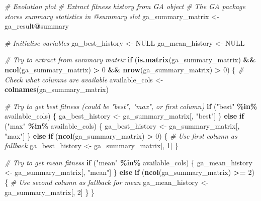 \documentclass[
]{article}
\newenvironment{Shaded}{\begin{snugshade}}{\end{snugshade}}
\newcommand{\CommentTok}[1]{\textcolor[rgb]{0.56,0.35,0.01}{\textit{#1}}}
\newcommand{\ConstantTok}[1]{\textcolor[rgb]{0.56,0.35,0.01}{#1}}
\newcommand{\ControlFlowTok}[1]{\textcolor[rgb]{0.13,0.29,0.53}{\textbf{#1}}}
\newcommand{\DecValTok}[1]{\textcolor[rgb]{0.00,0.00,0.81}{#1}}
\newcommand{\FunctionTok}[1]{\textcolor[rgb]{0.13,0.29,0.53}{\textbf{#1}}}
\newcommand{\NormalTok}[1]{#1}
\newcommand{\OtherTok}[1]{\textcolor[rgb]{0.56,0.35,0.01}{#1}}
\newcommand{\SpecialCharTok}[1]{\textcolor[rgb]{0.81,0.36,0.00}{\textbf{#1}}}
\newcommand{\StringTok}[1]{\textcolor[rgb]{0.31,0.60,0.02}{#1}}
\begin{document}
\begin{Shaded}
\begin{Highlighting}[]
\CommentTok{\# Evolution plot}
\CommentTok{\# Extract fitness history from GA object}
\CommentTok{\# The GA package stores summary statistics in @summary slot}
\NormalTok{ga\_summary\_matrix }\OtherTok{\textless{}{-}}\NormalTok{ ga\_result}\SpecialCharTok{@}\NormalTok{summary}

\CommentTok{\# Initialise variables}
\NormalTok{ga\_best\_history }\OtherTok{\textless{}{-}} \ConstantTok{NULL}
\NormalTok{ga\_mean\_history }\OtherTok{\textless{}{-}} \ConstantTok{NULL}

\CommentTok{\# Try to extract from summary matrix}
\ControlFlowTok{if}\NormalTok{ (}\FunctionTok{is.matrix}\NormalTok{(ga\_summary\_matrix) }\SpecialCharTok{\&\&} \FunctionTok{ncol}\NormalTok{(ga\_summary\_matrix) }\SpecialCharTok{\textgreater{}} \DecValTok{0} \SpecialCharTok{\&\&} \FunctionTok{nrow}\NormalTok{(ga\_summary\_matrix) }\SpecialCharTok{\textgreater{}} \DecValTok{0}\NormalTok{) \{}
  \CommentTok{\# Check what columns are available}
\NormalTok{  available\_cols }\OtherTok{\textless{}{-}} \FunctionTok{colnames}\NormalTok{(ga\_summary\_matrix)}
  
  \CommentTok{\# Try to get best fitness (could be "best", "max", or first column)}
  \ControlFlowTok{if}\NormalTok{ (}\StringTok{"best"} \SpecialCharTok{\%in\%}\NormalTok{ available\_cols) \{}
\NormalTok{    ga\_best\_history }\OtherTok{\textless{}{-}}\NormalTok{ ga\_summary\_matrix[, }\StringTok{"best"}\NormalTok{]}
\NormalTok{  \} }\ControlFlowTok{else} \ControlFlowTok{if}\NormalTok{ (}\StringTok{"max"} \SpecialCharTok{\%in\%}\NormalTok{ available\_cols) \{}
\NormalTok{    ga\_best\_history }\OtherTok{\textless{}{-}}\NormalTok{ ga\_summary\_matrix[, }\StringTok{"max"}\NormalTok{]}
\NormalTok{  \} }\ControlFlowTok{else} \ControlFlowTok{if}\NormalTok{ (}\FunctionTok{ncol}\NormalTok{(ga\_summary\_matrix) }\SpecialCharTok{\textgreater{}} \DecValTok{0}\NormalTok{) \{}
    \CommentTok{\# Use first column as fallback}
\NormalTok{    ga\_best\_history }\OtherTok{\textless{}{-}}\NormalTok{ ga\_summary\_matrix[, }\DecValTok{1}\NormalTok{]}
\NormalTok{  \}}
  
  \CommentTok{\# Try to get mean fitness}
  \ControlFlowTok{if}\NormalTok{ (}\StringTok{"mean"} \SpecialCharTok{\%in\%}\NormalTok{ available\_cols) \{}
\NormalTok{    ga\_mean\_history }\OtherTok{\textless{}{-}}\NormalTok{ ga\_summary\_matrix[, }\StringTok{"mean"}\NormalTok{]}
\NormalTok{  \} }\ControlFlowTok{else} \ControlFlowTok{if}\NormalTok{ (}\FunctionTok{ncol}\NormalTok{(ga\_summary\_matrix) }\SpecialCharTok{\textgreater{}=} \DecValTok{2}\NormalTok{) \{}
    \CommentTok{\# Use second column as fallback for mean}
\NormalTok{    ga\_mean\_history }\OtherTok{\textless{}{-}}\NormalTok{ ga\_summary\_matrix[, }\DecValTok{2}\NormalTok{]}
\NormalTok{  \}}
\NormalTok{\}}


\end{Highlighting}
\end{Shaded}
\end{document}
